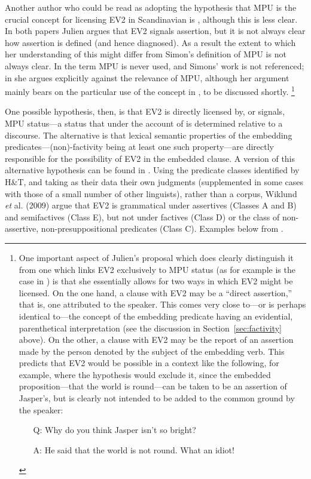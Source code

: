 \documentclass[output=paper]{LSP/langsci}
\begin{document}
Another author who could be read as adopting the hypothesis that MPU is the crucial concept for licensing EV2 in Scandinavian is \cite{julien09lingbuzz,julien15}, 
although this is less clear. In both papers Julien argues that EV2 signals assertion, but it is not always clear how assertion is defined (and hence diagnosed). As a result the extent to which her understanding of this might differ from Simon's definition of MPU is not always clear. In \cite{julien09lingbuzz} the term MPU is never used, and Simons' work is not referenced; in \cite{julien15} she argues explicitly against the relevance of MPU, although her argument mainly bears on the particular use of the concept in \cite{wiklund-etal09}, to be discussed shortly.%
\footnote{  
One important aspect of Julien's proposal which does clearly distinguish it from one which links EV2 exclusively to MPU status (as for example is the case in \citealt{jensen-christensen13}) is that she essentially allows for two ways in which EV2 might be licensed. On the one hand, a clause with EV2 may be a ``direct assertion,'' that is, one attributed to the speaker. This comes very close to---or is perhaps identical to---the concept of the embedding predicate having an evidential, parenthetical interpretation (see the discussion in Section~\ref{sec:factivity} above). On the other, a clause with EV2 may be the report of an assertion made by the person denoted by the subject of the embedding verb. This predicts that EV2 would be possible in a context like the following, for example, where the \cite{jensen-christensen13} hypothesis would exclude it, since the embedded proposition---that the world is round---can be taken to be an assertion of Jasper's, but is clearly not intended to be added to the common ground by the speaker:
\begin{itemize}
\item[Q: ] Why do you think Jasper isn't so bright?
\item[A: ] He said that the world is not round.  What an idiot!
\end{itemize} 
}

One possible hypothesis, then, is that EV2 is directly licensed by, or signals, MPU status---a status that under the account of \cite{simons07}  is determined relative to a discourse. The alternative is that lexical semantic properties of the embedding predicates---(non)-factivity being at least one such property---are directly responsible for the possibility of EV2 in the embedded clause. A version of this alternative hypothesis can be found in \cite{wiklund-etal09}.  
Using the predicate classes identified by H\&T, and taking as their data their own judgments (supplemented in some cases with those of a small number of other linguists), rather than a corpus,  Wiklund \textit{et} al. (2009) argue that EV2 is grammatical under assertives (Classes A and B) and semifactives (Class E), but not under factives (Class D) or the class of non-assertive, non-presuppositional predicates (Class C). %
Examples below from \cite[p.~1918--21]{wiklund-etal09}.
\end{document}
